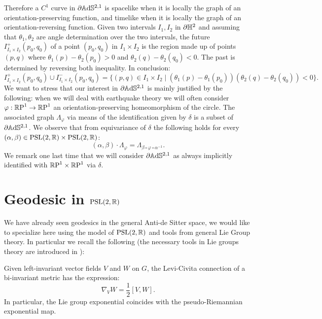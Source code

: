Therefore a $C^1$ curve in $\partial\A^{2,1}$ is spacelike when it is locally the graph of an orientation-preserving function, and timelike when it is locally the graph of an orientation-reversing function. Given two intervals $I_1,I_2$ in $\partial\H^2$ and assuming that $\theta_1,\theta_2$ are angle determination over the two intervals, the future $I^+_{I_1\times I_2}(p_0,q_0)$ of a point $(p_0,q_0)$ in $I_1\times I_2$ is the region made up of points $(p,q)$ where $\theta_1(p)-\theta_2(p_0)>0$ and $\theta_2(q)-\theta_2(q_0)<0$. The past is determined by reversing both inequality. In conclusion: 
\begin{equation}\label{angular}
    I^+_{I_1\times I_2}(p_0,q_0)\cup I^-_{I_1\times I_2}(p_0,q_0)=\{(p,q)\in I_1\times I_2\;|\;(\theta_1(p)-\theta_1(p_0))(\theta_2(q)-\theta_2(q_0))<0\}.
\end{equation}
We want to stress that our interest in $\partial\A^{2,1}$ is mainly justified by the following: when we will deal with earthquake theory we will often consider $\varphi:\S\to\S$ an orientation-preserving homeomorphism of the circle. The associated graph $\Lambda_\varphi$ via means of the identification given by $\delta$ is a subset of $\partial\A^{2,1}$. We observe that from equivariance of $\delta$ the following holds for every $(\alpha,\beta)\in\PSL\times\PSL$: 
\begin{equation}\label{graphequivariancy}
(\alpha,\beta)\cdot\Lambda_\varphi=\Lambda_{\beta\circ\varphi\circ\alpha^{-1}}.
\end{equation}
We remark one last time that we will consider $\partial\A^{2,1}$ as always implicitly identified with $\T$ via $\delta$.

\section{Geodesic in $\PSL$}\label{geosection} We have already seen geodesics in the general Anti-de Sitter space, we would like to specialize here using the model of $\PSL$ and tools from general Lie Group theory. In particular we recall the following (the necessary tools in Lie groups theory are introduced in \cite{bonsanteseppi}): 
\begin{lemma}\label{331}
    Given left-invariant vector fields $V$ and $W$ on $G$, the Levi-Civita connection of a bi-invariant metric has the expression: 
    \[
        \nabla_VW=\frac{1}{2}[V,W].
    \]
    In particular, the Lie group exponential coincides with the pseudo-Riemannian exponential map.
\end{lemma}




